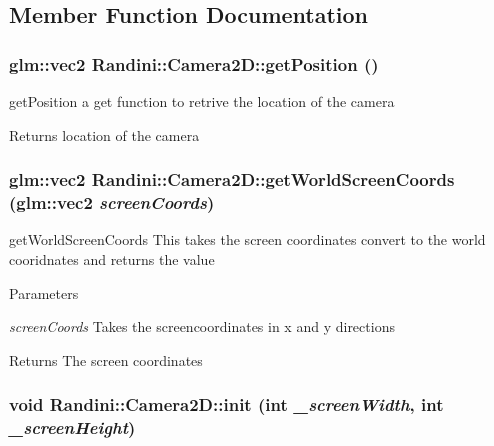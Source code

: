 \subsection{Member Function Documentation}
\hypertarget{classRandini_1_1Camera2D_ad9bb40c09c7f51960574a795124bf1ad}{
\subsubsection[{getPosition}]{\setlength{\rightskip}{0pt plus 5cm}glm::vec2 Randini::Camera2D::getPosition ()}}
\label{classRandini_1_1Camera2D_ad9bb40c09c7f51960574a795124bf1ad}


getPosition a get function to retrive the location of the camera \begin{DoxyReturn}{Returns}
location of the camera 
\end{DoxyReturn}
\hypertarget{classRandini_1_1Camera2D_a545b5ce7ca9f2c99b8fc7837d6ee4872}{
\subsubsection[{getWorldScreenCoords}]{\setlength{\rightskip}{0pt plus 5cm}glm::vec2 Randini::Camera2D::getWorldScreenCoords (glm::vec2 {\em screenCoords})}}
\label{classRandini_1_1Camera2D_a545b5ce7ca9f2c99b8fc7837d6ee4872}


getWorldScreenCoords This takes the screen coordinates convert to the world cooridnates and returns the value 
\begin{DoxyParams}{Parameters}
\item[{\em screenCoords}]Takes the screencoordinates in x and y directions \end{DoxyParams}
\begin{DoxyReturn}{Returns}
The screen coordinates 
\end{DoxyReturn}
\hypertarget{classRandini_1_1Camera2D_ab658d7f26ed3fec10ac4e16882ea85e0}{
\subsubsection[{init}]{\setlength{\rightskip}{0pt plus 5cm}void Randini::Camera2D::init (int {\em \_\-screenWidth}, \/  int {\em \_\-screenHeight})}}
\label{classRandini_1_1Camera2D_ab658d7f26ed3fec10ac4e16882ea85e0}


